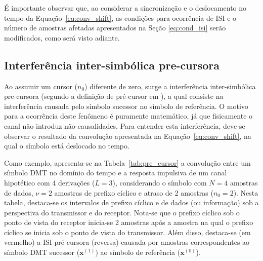 É importante observar que, ao considerar a sincronização e o deslocamento no tempo da Equação~\ref{eq:conv_shift}, as condições para ocorrência de ISI e o número de amostras afetadas apresentados na Seção \ref{eq:cond_isi} serão modificados, como será visto adiante. 

\subsection{Interferência inter-simbólica pre-cursora}
\label{sec:ici}

Ao assumir um cursor ($n_0$) diferente de zero, surge a interferência inter-simbólica pre-cursora (segundo a definição de pré-cursor em \cite{fundamentalsDSLch11}), a qual consiste na interferência causada pelo símbolo sucessor no símbolo de referência. O motivo para a ocorrência deste fenômeno é puramente matemático, já que fisicamente o canal não introduz não-causalidades. Para entender esta interferência, deve-se observar o resultado da convolução apresentada na Equação~\ref{eq:conv_shift}, na qual o símbolo está deslocado no tempo. 

Como exemplo, apresenta-se na Tabela~\ref{tab:pre_cursor} a convolução entre um símbolo DMT no domínio do tempo e a resposta impulsiva de um canal hipotético com 4 derivações ($L = 3$), considerando o símbolo com $N = 4$ amostras de dados, $\nu = 2$  amostras de prefixo cíclico e atraso de 2 amostras ($n_0=2$). Nesta tabela, destaca-se os intervalos de prefixo cíclico e de dados (ou informação) sob a perspectiva do transmissor e do receptor. Nota-se que o prefixo cíclico sob o ponto de vista do receptor inicia-se 2 amostras após a amostra na qual o prefixo cíclico se inicia sob o ponto de vista do transmissor. Além disso, destaca-se (em vermelho) a ISI pré-cursora (reversa) causada por amostras correspondentes ao símbolo DMT sucessor ($\mathbf{x}^{(1)}$) ao símbolo de referência ($\mathbf{x}^{(0)}$).

